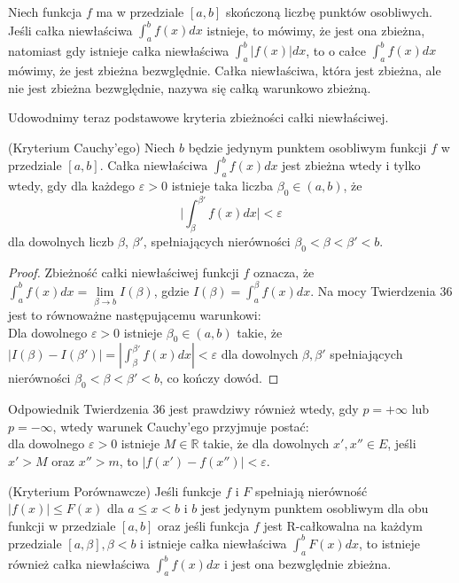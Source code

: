 \documentclass[leqno]{article}
\begin{document}
\begin{justify}
\begin{defn}
    Niech funkcja $f$ ma w przedziale $[a,b]$ skończoną liczbę punktów osobliwych. 
    Jeśli całka niewłaściwa $\int_{a}^{b}f(x)dx$ istnieje, to mówimy, że jest ona zbieżna, natomiast gdy istnieje całka niewłaściwa $\int_{a}^{b}|f(x)|dx$, to o całce
    $\int_{a}^{b}f(x)dx$ mówimy, że jest zbieżna bezwględnie. Całka niewłaściwa, która jest zbieżna, ale nie jest zbieżna bezwględnie, nazywa się całką warunkowo zbieżną.
\end{defn}

Udowodnimy teraz podstawowe kryteria zbieżności całki niewłaściwej.

\begin{theorem}
{
    (Kryterium Cauchy'ego) Niech $b$ będzie jedynym punktem osobliwym funkcji $f$ w przedziale $[a,b]$. Całka niewłaściwa $\int_{a}^{b}f(x)dx$ jest zbieżna wtedy i tylko wtedy, gdy
    dla każdego $\varepsilon > 0$ istnieje taka liczba $\beta_0 \in (a,b)$, że
    \[
        \Bigg|\int_{\beta}^{\beta'}f(x)dx \Bigg| < \varepsilon
    \]
    dla dowolnych liczb $\beta$, $\beta'$, spełniających nierówności $\beta_0 < \beta < \beta' < b$.
}
\end{theorem}

\begin{proof}
    Zbieżność całki niewłaściwej funkcji $f$ oznacza, że $\int_{a}^{b}f(x)dx = \lim\limits_{\beta \to b}I(\beta)$, gdzie $I(\beta) = \int_{a}^{\beta}f(x)dx$.
    Na mocy Twierdzenia 36 jest to równoważne następującemu warunkowi: \\
    Dla dowolnego $\varepsilon > 0$ istnieje $\beta_0 \in (a,b)$ takie, że $|I(\beta) - I(\beta')| = |\int_{\beta}^{\beta'}f(x)dx| < \varepsilon$ 
    dla dowolnych $\beta, \beta'$ spełniających nierówności $\beta_0 < \beta < \beta' < b$, co kończy dowód.
\end{proof}

Odpowiednik Twierdzenia 36 jest prawdziwy również wtedy, gdy $p = +\infty$ lub $p = -\infty$, wtedy
warunek Cauchy'ego przyjmuje postać: \\ 
dla dowolnego $\varepsilon > 0$ istnieje $M \in \mathbb{R}$ takie, że dla dowolnych $x', x'' \in E$, jeśli $x' > M$ oraz $x'' > m$, to
$|f(x')-f(x'')| < \varepsilon$.

\begin{theorem}
{
    (Kryterium Porównawcze) Jeśli funkcje $f$ i $F$ spełniają nierówność $|f(x)| \leqslant F(x)$ dla $a \leqslant x < b$ i $b$ jest
    jedynym punktem osobliwym dla obu funkcji w przedziale $[a,b]$ oraz jeśli funkcja $f$ jest R-całkowalna na każdym przedziale 
    $[a, \beta], \beta < b$ i istnieje całka niewłaściwa $\int_{a}^{b}F(x)dx$, to istnieje również całka niewłaściwa $\int_{a}^{b}f(x)dx$ i jest ona
    bezwględnie zbieżna.
}
\end{theorem}


\end{justify}
\end{document}
